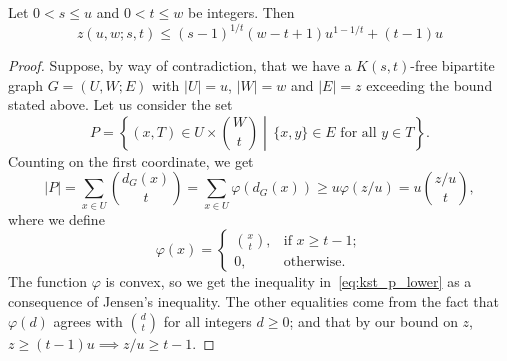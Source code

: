 \begin{theorem} \label{thm:kst} %
    Let $0 < s \leq u$ and $0 < t \leq w$ be integers.
    Then
    \[z(u, w; s, t) \leq (s - 1)^{1 / t}(w - t + 1)u^{1 - 1 / t} + (t - 1)u\]
    \begin{proof}
        Suppose, by way of contradiction, that we have a $K(s, t)$-free bipartite graph $G = (U, W; E)$
        with $|U| = u$, $|W| = w$ and $|E| = z$ exceeding the bound stated above.
        Let us consider the set
        \[
            P = \left\{ (x, T) \in U \times \binom{W}{t}
            \middle\vert\, \{x, y\} \in E \text{ for all } y \in T \right\}.
        \]
        Counting on the first coordinate, we get
        \begin{equation} \label{eq:kst_p_lower}
            |P| =
            \sum_{x \in U} \binom{d_G(x)}{t} =
            \sum_{x \in U} \varphi(d_G(x)) \geq
            u \varphi(z/u) =
            u \binom{z / u}{t},
        \end{equation}
        where we define
        \[
            \varphi(x) =
            \begin{cases}
                \binom{x}{t}, & \text{if } x \geq t - 1; \\
                0, & \text{otherwise.}
            \end{cases}
        \]
        The function $\varphi$ is convex, so we get the inequality in~\eqref{eq:kst_p_lower}
        as a consequence of Jensen's inequality.
        The other equalities come from the fact that $\varphi(d)$ agrees
        with $\binom{d}{t}$ for all integers $d \geq 0$;
        and that by our bound on $z$, $z \geq (t-1)u \implies z/u \geq t - 1$.


\end{proof}
\end{theorem}
